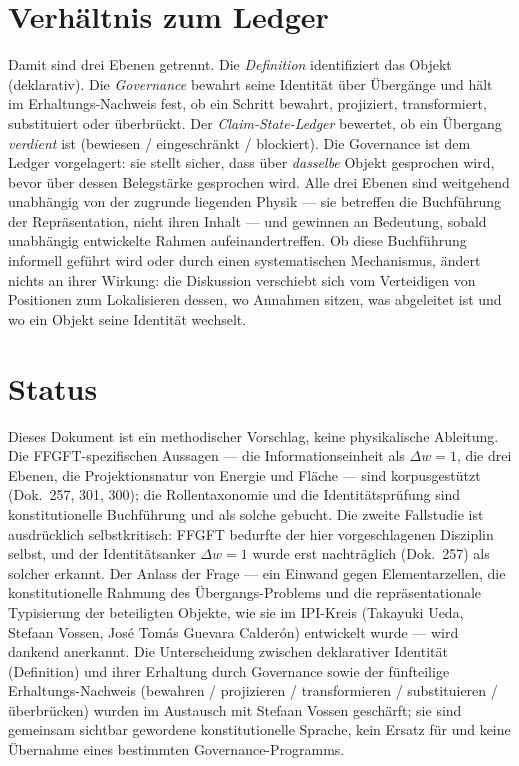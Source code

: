 \section{Verhältnis zum Ledger}

Damit sind drei Ebenen getrennt. Die \emph{Definition} identifiziert das Objekt
(deklarativ). Die \emph{Governance} bewahrt seine Identität über Übergänge und hält im
Erhaltungs-Nachweis fest, ob ein Schritt bewahrt, projiziert, transformiert, substituiert
oder überbrückt. Der \emph{Claim-State-Ledger} bewertet, ob ein Übergang \emph{verdient}
ist (bewiesen / eingeschränkt / blockiert). Die Governance ist dem Ledger vorgelagert: sie
stellt sicher, dass über \emph{dasselbe} Objekt gesprochen wird, bevor über dessen
Belegstärke gesprochen wird. Alle drei Ebenen sind weitgehend unabhängig von der zugrunde
liegenden Physik --- sie betreffen die Buchführung der Repräsentation, nicht ihren Inhalt
--- und gewinnen an Bedeutung, sobald unabhängig entwickelte Rahmen aufeinandertreffen.
Ob diese Buchführung informell geführt wird oder durch einen systematischen Mechanismus,
ändert nichts an ihrer Wirkung: die Diskussion verschiebt sich vom Verteidigen von
Positionen zum Lokalisieren dessen, wo Annahmen sitzen, was abgeleitet ist und wo ein
Objekt seine Identität wechselt.

\section{Status}

Dieses Dokument ist ein methodischer Vorschlag, keine physikalische Ableitung. Die
FFGFT-spezifischen Aussagen --- die Informationseinheit als $\Delta w = 1$, die drei
Ebenen, die Projektionsnatur von Energie und Fläche --- sind korpusgestützt (Dok.~257,
301, 300); die Rollentaxonomie und die Identitätsprüfung sind konstitutionelle
Buchführung und als solche gebucht. Die zweite Fallstudie ist ausdrücklich
selbstkritisch: FFGFT bedurfte der hier vorgeschlagenen Disziplin selbst, und der
Identitätsanker $\Delta w = 1$ wurde erst nachträglich (Dok.~257) als solcher erkannt.
Der Anlass der Frage --- ein Einwand gegen Elementarzellen, die konstitutionelle Rahmung
des Übergangs-Problems und die repräsentationale Typisierung der beteiligten Objekte, wie
sie im IPI-Kreis (Takayuki Ueda, Stefaan Vossen, José Tomás Guevara Calderón) entwickelt
wurde --- wird dankend anerkannt. Die Unterscheidung zwischen deklarativer Identität
(Definition) und ihrer Erhaltung durch Governance sowie der fünfteilige
Erhaltungs-Nachweis (bewahren / projizieren / transformieren / substituieren /
überbrücken) wurden im Austausch mit Stefaan Vossen geschärft; sie sind gemeinsam
sichtbar gewordene konstitutionelle Sprache, kein Ersatz für und keine Übernahme eines
bestimmten Governance-Programms.
